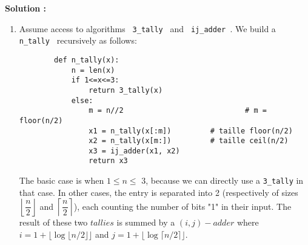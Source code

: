 \documentclass[11pt]{article} %
\newenvironment{solution}[1][\unskip]{%
	\par
	\noindent
	\textbf{Solution #1:}
	\noindent}
{\medskip}
\begin{document}
	\begin{solution}
		\begin{enumerate}

		\item{Assume access to algorithms \verb | 3_tally | and \verb | ij_adder |. We build a \verb | n_tally | recursively as follows:}

		\begin{lstlisting}
		def n_tally(x):
			n = len(x)
			if 1<=x<=3:
				return 3_tally(x)
			else:
				m = n//2							# m = floor(n/2)
				x1 = n_tally(x[:m])			# taille floor(n/2)
				x2 = n_tally(x[m:])			# taille ceil(n/2)
				x3 = ij_adder(x1, x2)
				return x3
		\end{lstlisting}

		The basic case is when $ 1 \leq n \leq $ 3, because we can directly use a \verb|3_tally| in that case. In other cases, the entry is separated into 2 (respectively of sizes $ \left\lfloor \dfrac{n}{2} \right\rfloor $ and $ \left\lceil \dfrac{n}{2} \right\rceil $), each counting the number of bits "1" in their input. The result of these two $ tallies $ is summed by a $ (i,j)-adder $ where $ i = 1 + \lfloor \log \lfloor n / 2 \rfloor \rfloor $ and $ j = 1 + \lfloor \log \lceil n / 2 \rceil \rfloor $.



\end{enumerate}
\end{solution}
\end{document}
